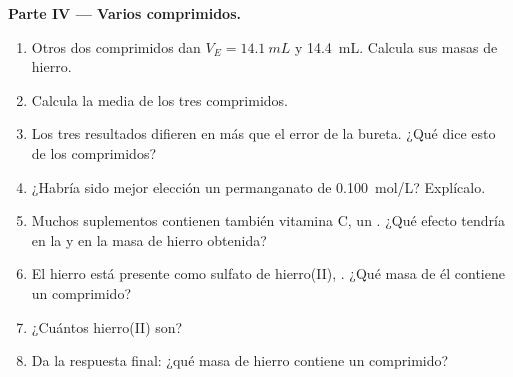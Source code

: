 \begin{problem}
\medskip
\noindent\textbf{Parte IV --- Varios comprimidos.}
\begin{enumerate}[resume]
  \item Otros dos comprimidos dan $V_E = \qty{14.1}{mL}$ y
        \qty{14.4}{mL}. Calcula sus masas de hierro.
  \item Calcula la media de los tres comprimidos.
  \item Los tres resultados difieren en más que el error de la bureta.
        ¿Qué dice esto de los comprimidos?
  \item ¿Habría sido mejor elección un permanganato de
        \qty{0.100}{mol/L}? Explícalo.
  \item Muchos suplementos contienen también vitamina C, un .
        ¿Qué efecto tendría en la  y en la masa de hierro
        obtenida?
  \item El hierro está presente como sulfato de hierro(II), .
        ¿Qué masa de él contiene un comprimido?
  \item ¿Cuántos  hierro(II) son?
  \item Da la respuesta final: ¿qué masa de hierro contiene un
        comprimido?
\end{enumerate}
\end{problem}
